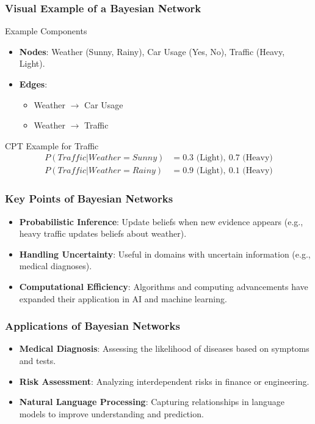 \documentclass[aspectratio=169]{beamer}
\begin{document}
\begin{frame}[fragile]
    \frametitle{Visual Example of a Bayesian Network}
    \begin{block}{Example Components}
        \begin{itemize}
            \item \textbf{Nodes}: Weather (Sunny, Rainy), Car Usage (Yes, No), Traffic (Heavy, Light).
            \item \textbf{Edges}:
            \begin{itemize}
                \item Weather $\rightarrow$ Car Usage
                \item Weather $\rightarrow$ Traffic
            \end{itemize}
        \end{itemize}
    \end{block}
    
    \begin{block}{CPT Example for Traffic}
        \begin{align*}
            P(Traffic | Weather = Sunny) &= 0.3 \text{ (Light)}, \ 0.7 \text{ (Heavy)} \\
            P(Traffic | Weather = Rainy) &= 0.9 \text{ (Light)}, \ 0.1 \text{ (Heavy)}
        \end{align*}
    \end{block}
\end{frame}

\begin{frame}[fragile]
    \frametitle{Key Points of Bayesian Networks}
    \begin{itemize}
        \item \textbf{Probabilistic Inference}: Update beliefs when new evidence appears (e.g., heavy traffic updates beliefs about weather).
        \item \textbf{Handling Uncertainty}: Useful in domains with uncertain information (e.g., medical diagnoses).
        \item \textbf{Computational Efficiency}: Algorithms and computing advancements have expanded their application in AI and machine learning.
    \end{itemize}
\end{frame}

\begin{frame}[fragile]
    \frametitle{Applications of Bayesian Networks}
    \begin{itemize}
        \item \textbf{Medical Diagnosis}: Assessing the likelihood of diseases based on symptoms and tests.
        \item \textbf{Risk Assessment}: Analyzing interdependent risks in finance or engineering.
        \item \textbf{Natural Language Processing}: Capturing relationships in language models to improve understanding and prediction.
    \end{itemize}
\end{frame}
\end{document}
